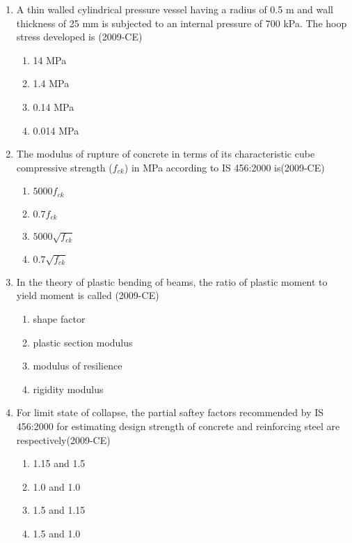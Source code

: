 \documentclass[journal,12pt,twocolumn]{IEEEtran}
\theoremstyle{remark}
\begin{document}
\begin{enumerate}
\item A thin walled cylindrical pressure vessel having a radius of 0.5 m and wall thickness of 25 mm is subjected to an internal pressure of 700 kPa. The hoop stress developed is \hfill{(2009-CE)}

	\begin{enumerate}
		\item 14 MPa
		\item 1.4 MPa
		\item 0.14 MPa
		\item 0.014 MPa
	\end{enumerate}		

\item The modulus of rupture of concrete in terms of its characteristic cube compressive strength ($f_{ck}$) in MPa according to IS 456:2000 is\hfill{(2009-CE)}

	\begin{enumerate}
		\item $5000f_{ck}$
		\item $0.7f_{ck}$
		\item $5000\sqrt{f_{ck}}$
		\item $0.7\sqrt{f_{ck}}$
	\end{enumerate}


\item In the theory of plastic bending of beams, the ratio of plastic moment to yield moment is called                     \hfill{(2009-CE)}

	\begin{enumerate}
		\item shape factor
		\item plastic section modulus
		\item modulus of resilience
		\item rigidity modulus
	\end{enumerate}

\item For limit state of collapse, the partial saftey factors recommended by IS 456:2000 for estimating design strength of concrete and reinforcing steel are respectively\hfill{(2009-CE)}

	\begin{enumerate}
		\item 1.15 and 1.5
		\item 1.0 and 1.0
		\item 1.5 and 1.15
		\item 1.5 and 1.0
	\end{enumerate}





\end{enumerate}
\end{document}
